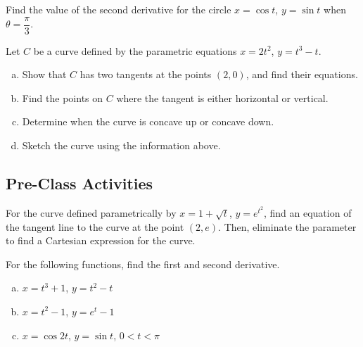 \documentclass[notes]{subfiles}
\begin{document}
		\begin{ex}
			Find the value of the second derivative for the circle $x = \cos t$, $y = \sin t$ when $\theta = \dfrac{\pi}{3}$.
		\end{ex}
			\newpage
		
		\begin{ex}
			Let $C$ be a curve defined by the parametric equations $x = 2t^2$, $y = t^3-t$.
			\begin{enumerate}[(a)]
				\item Show that $C$ has two tangents at the points $(2,0)$, and find their equations.
					
				\item Find the points on $C$ where the tangent is either horizontal or vertical.
					
				\item Determine when the curve is concave up or concave down.
					
				\item Sketch the curve using the information above.
			\end{enumerate}
		\end{ex}	
			\newpage
			
	\subsection*{Pre-Class Activities}
		\begin{ex}
			For the curve defined parametrically by $x = 1 + \sqrt{t}$, $y = e^{t^2}$, find an equation of the tangent line to the curve at the point $(2,e)$.  Then, eliminate the parameter to find a Cartesian expression for the curve.
		\end{ex}
			\vs{1}
			
		\begin{ex}
			For the following functions, find the first and second derivative.
			\begin{enumerate}[(a)]
				\item $x = t^3 + 1$, $y = t^2-t$
					\vs{1}
					
				\item $x = t^2-1$, $y = e^t-1$
					\vs{1}
					
				\item $x = \cos 2t$, $y = \sin t$, $0 < t < \pi$
					\vs{1}
					
			\end{enumerate}
		\end{ex}
			\newpage
			
\end{document}

